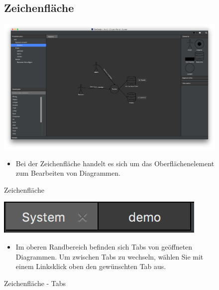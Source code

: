 \begin{figure}[h!]
\subsection{Zeichenfläche}
	\centering
	\includegraphics[width=1\textwidth]{Design_Dark.png}
	\caption{Zeichenfläche}	
\begin{itemize}	
\item Bei der Zeichenfläche handelt es sich um das Oberflächenelement zum Bearbeiten von Diagrammen. 
\end{itemize}
\end{figure}

\begin{figure}[h!]
	\centering
	\includegraphics[width=.4\textwidth]{Tabs.png}
	\caption{Zeichenfläche - Tabs}	
\begin{itemize}	
\item Im oberen Randbereich befinden sich Tabs von geöffneten Diagrammen. Um zwischen Tabs zu wechseln, wählen Sie mit einem Linksklick oben den gewünschten Tab aus.
\end{itemize}
\end{figure}

